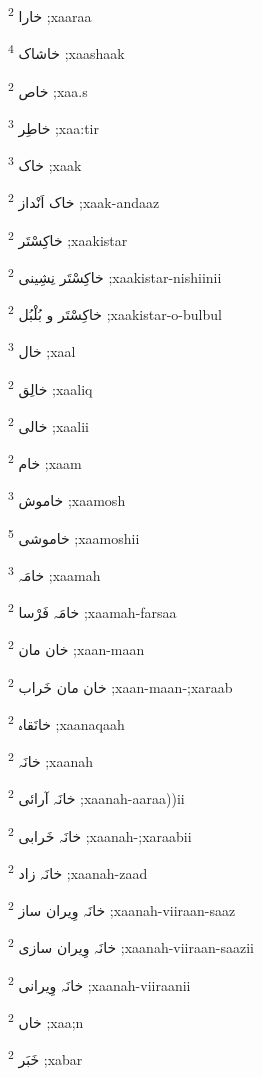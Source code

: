 \documentclass[12pt]{article}
\begin{document}
\begin{multicols}{5}
{\ur خارا}   \textsuperscript{2} ;xaaraa

{\ur خاشاک}   \textsuperscript{4} ;xaashaak

{\ur خاص}   \textsuperscript{2} ;xaa.s

{\ur خاطِر}   \textsuperscript{3} ;xaa:tir

{\ur خاک}   \textsuperscript{3} ;xaak

{\ur خاک اَنْداز}   \textsuperscript{2} ;xaak-andaaz

{\ur خاکِسْتَر}   \textsuperscript{2} ;xaakistar

{\ur خاکِسْتَر نِشِینی}   \textsuperscript{2} ;xaakistar-nishiinii

{\ur خاکِسْتَر و بُلْبُل}   \textsuperscript{2} ;xaakistar-o-bulbul

{\ur خال}   \textsuperscript{3} ;xaal

{\ur خالِق}   \textsuperscript{2} ;xaaliq

{\ur خالی}   \textsuperscript{2} ;xaalii

{\ur خام}   \textsuperscript{2} ;xaam

{\ur خاموش}   \textsuperscript{3} ;xaamosh

{\ur خاموشی}   \textsuperscript{5} ;xaamoshii

{\ur خامَہ}   \textsuperscript{3} ;xaamah

{\ur خامَہ فَرْسا}   \textsuperscript{2} ;xaamah-farsaa

{\ur خان مان}   \textsuperscript{2} ;xaan-maan

{\ur خان مان خَراب}   \textsuperscript{2} ;xaan-maan-;xaraab

{\ur خانَقاہ}   \textsuperscript{2} ;xaanaqaah

{\ur خانَہ}   \textsuperscript{2} ;xaanah

{\ur خانَہ آرائی}   \textsuperscript{2} ;xaanah-aaraa))ii

{\ur خانَہ خَرابی}   \textsuperscript{2} ;xaanah-;xaraabii

{\ur خانَہ زاد}   \textsuperscript{2} ;xaanah-zaad

{\ur خانَہ وِیران ساز}   \textsuperscript{2} ;xaanah-viiraan-saaz

{\ur خانَہ وِیران سازی}   \textsuperscript{2} ;xaanah-viiraan-saazii

{\ur خانَہ وِیرانی}   \textsuperscript{2} ;xaanah-viiraanii

{\ur خاں}   \textsuperscript{2} ;xaa;n

{\ur خَبَر}   \textsuperscript{2} ;xabar


\end{multicols}
\end{document}
